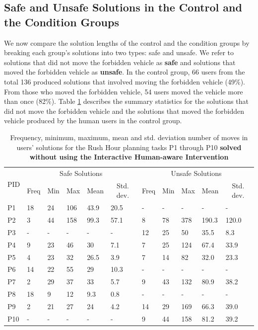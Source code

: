 \subsection{Safe and Unsafe Solutions in the Control and the Condition Groups}
We now compare the solution lengths of the control and the condition groups by breaking each group's solutions into two types: safe and unsafe. 
We refer to solutions that did not move the forbidden vehicle as \textbf{safe} and solutions that moved the forbidden vehicle as \textbf{unsafe}.
In the control group, 66 users from the total 136 produced solutions that involved moving the forbidden vehicle (49\%).
From those who moved the forbidden vehicle, 54 users moved the vehicle more than once (82\%).
Table \ref{tab:usersolutions} describes the summary statistics for the solutions that did not move the forbidden vehicle and the solutions that moved the forbidden vehicle produced by the human users in the control group.

\begin{table}[tpb]
\begin{tabular}{|l|l|l|l|l|l|l|l|l|l|l|}
\hline
\multicolumn{1}{|c|}{\multirow{2}{*}{PID}} &
  \multicolumn{5}{c|}{Safe Solutions} &
  \multicolumn{5}{c|}{Unsafe Solutions} \\ \cline{2-11} 
\multicolumn{1}{|c|}{} &
  \multicolumn{1}{c|}{Freq} &
  \multicolumn{1}{c|}{Min} &
  \multicolumn{1}{c|}{Max} &
  \multicolumn{1}{c|}{Mean} &
  \multicolumn{1}{c|}{Std. dev.} &
  \multicolumn{1}{c|}{Freq} &
  \multicolumn{1}{c|}{Min} &
  \multicolumn{1}{c|}{Max} &
  \multicolumn{1}{c|}{Mean} &
  \multicolumn{1}{c|}{Std. dev.} \\ \hline
P1  & 18 & 24 & 106 & 43.9  & 20.5  & -  & -  & -   & -    & -    \\ 
P2  &  3  & 44 & 158 & 99.3 & 57.1 & 8  & 78 & 378 & 190.3 & 120.0\\ 
P3  & -  & -  & -   & -     & -     & 12 & 25 & 50  & 35.5 & 8.3  \\ 
P4  & 9  & 23 & 46  & 30    & 7.1   & 7  & 25 & 124 & 67.4 & 33.9 \\ 
P5  & 4  & 23 & 32  & 26.5  & 3.9   & 7  & 14 & 82  & 32.0 & 23.3 \\
P6  & 14 & 22 & 55  & 29    & 10.3  & -  & -  & -   & -    & -    \\
P7  & 2  & 29 & 37  & 33    & 5.7   & 9  & 43 & 132 & 80.9 & 38.2 \\ 
P8  & 18 & 9  & 12  & 9.3   & 0.8   & -  & -  & -   & -    & -    \\
P9  & 2  & 21 & 27  & 24    & 4.2   & 14 & 29 & 169 & 66.3 & 39.0 \\
P10 & -  & -  & -   & -     & -     & 9  & 44 & 158 & 81.2 & 39.2 \\ \hline
\end{tabular}
\caption{Frequency, minimum, maximum, mean and std. deviation number of moves in users' solutions for the Rush Hour planning tasks P1 through P10 \textbf{solved without using the Interactive Human-aware Intervention}}
\label{tab:usersolutions}
\end{table}

